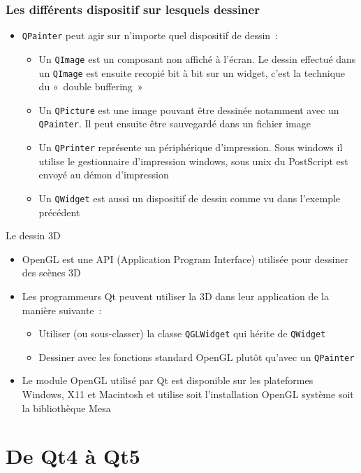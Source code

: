 \documentclass{beamer} %
\begin{document}
\begin{frame}
	\frametitle{Les différents dispositif sur lesquels dessiner}

	\begin{itemize}
	\item \texttt{QPainter} peut agir sur n'importe quel dispositif de dessin~:
		\begin{itemize}
		\item<2-> Un \texttt{QImage} est un composant non affiché à l'écran. Le dessin effectué dans un \texttt{QImage} est ensuite recopié bit à bit sur un widget, c'est la technique du «~double buffering~»
		\item<3-> Un \texttt{QPicture} est une image pouvant être dessinée notamment avec un \texttt{QPainter}. Il peut ensuite être sauvegardé dans un fichier image
		\item<4-> Un \texttt{QPrinter} représente un périphérique d'impression. Sous windows il utilise le gestionnaire d'impression windows, sous unix du PostScript est envoyé au démon d'impression
		\item<5-> Un \texttt{QWidget} est aussi un dispositif de dessin comme vu dans l'exemple précédent
		\end{itemize}
	\end{itemize}
\end{frame}

\begin{frame}{Le dessin 3D}
	\begin{itemize}
	\item OpenGL est une API (Application Program Interface) utilisée pour dessiner des scènes 3D
	\item<2-> Les programmeurs Qt peuvent utiliser la 3D dans leur application de la manière suivante~:
		\begin{itemize}
		\item<3-> Utiliser (ou sous-classer) la classe \texttt{QGLWidget} qui hérite de \texttt{QWidget}
		\item<4-> Dessiner avec les fonctions standard OpenGL plutôt qu'avec un \texttt{QPainter}
		\end{itemize}
	\item<5-> Le module OpenGL utilisé par Qt est disponible sur les plateformes Windows, X11 et Macintosh et utilise soit l'installation OpenGL système soit la bibliothèque Mesa
	\end{itemize}
\end{frame}

\section{De Qt4 à Qt5}
\end{document}
